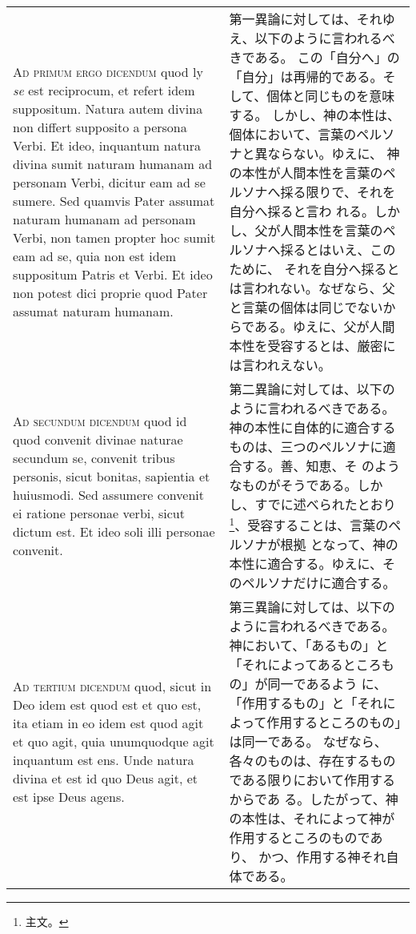 \documentclass[10pt]{jsarticle} %
\begin{document}
\begin{longtable}{p{21em}p{21em}}
\\




{\scshape Ad primum ergo dicendum} quod ly {\slshape se} est reciprocum, et refert idem
 suppositum. Natura autem divina non differt supposito a persona
 Verbi. Et ideo, inquantum natura divina sumit naturam humanam ad
 personam Verbi, dicitur eam ad se sumere. Sed quamvis Pater assumat
 naturam humanam ad personam Verbi, non tamen propter hoc sumit eam ad
 se, quia non est idem suppositum Patris et Verbi. Et ideo non potest
 dici proprie quod Pater assumat naturam humanam.


&

第一異論に対しては、それゆえ、以下のように言われるべきである。
この「自分へ」の「自分」は再帰的である。そして、個体と同じものを意味する。
 しかし、神の本性は、個体において、言葉のペルソナと異ならない。ゆえに、
 神の本性が人間本性を言葉のペルソナへ採る限りで、それを自分へ採ると言わ
 れる。しかし、父が人間本性を言葉のペルソナへ採るとはいえ、このために、
 それを自分へ採るとは言われない。なぜなら、父と言葉の個体は同じでないか
 らである。ゆえに、父が人間本性を受容するとは、厳密には言われえない。

\\




{\scshape Ad secundum dicendum} quod id quod convenit divinae naturae secundum se,
 convenit tribus personis, sicut bonitas, sapientia et huiusmodi. Sed
 assumere convenit ei ratione personae verbi, sicut dictum est. Et ideo
 soli illi personae convenit.


&

第二異論に対しては、以下のように言われるべきである。
神の本性に自体的に適合するものは、三つのペルソナに適合する。善、知恵、そ
 のようなものがそうである。しかし、すでに述べられたとおり\footnote{主文。}、受容することは、言葉のペルソナが根拠
 となって、神の本性に適合する。ゆえに、そのペルソナだけに適合する。

\\




{\scshape Ad tertium dicendum} quod, sicut in Deo idem est quod est et quo est, ita
 etiam in eo idem est quod agit et quo agit, quia unumquodque agit
 inquantum est ens. Unde natura divina et est id quo Deus agit, et est
 ipse Deus agens.


&

第三異論に対しては、以下のように言われるべきである。
神において、「あるもの」と「それによってあるところもの」が同一であるよう
 に、「作用するもの」と「それによって作用するところのもの」は同一である。
 なぜなら、各々のものは、存在するものである限りにおいて作用するからであ
 る。したがって、神の本性は、それによって神が作用するところのものであり、
 かつ、作用する神それ自体である。

\end{longtable}
\newpage
\end{document}
